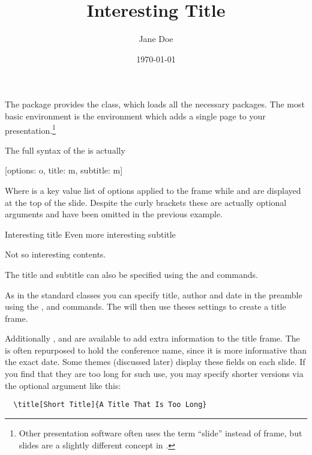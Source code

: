 The  package provides the  class, which loads all the
necessary packages. The most basic environment is the  environment
which adds a single page to your presentation.\footnote{Other presentation
  software often uses the term \enquote{slide} instead of frame, but slides are
  a slightly different concept in .}
The full syntax of the  is actually
\begin{lscommand}
  [options: o, title: m, subtitle: m]
\end{lscommand}
Where  is a key value list of options applied to the frame while
 and  are displayed at the top of the slide. Despite
the curly brackets these are actually optional arguments and have been
omitted in the previous example.
\begin{example}
\begin{frame}{%
  Interesting title}{%
  Even more interesting
  subtitle}
  
  Not so interesting contents.
\end{frame}
\end{example}
The title and subtitle can also be specified using the  and
 commands.

As in the standard classes you can specify title, author and date in the preamble
using the ,  and  commands. The
 will then use theses settings to create a title frame.
\begin{example}
\author{Jane Doe}
\title{Interesting Title}
\date{\today}

\maketitle
\end{example}
Additionally ,  and  are
available to add extra information to the title frame. The  is often
repurposed to hold the conference name, since it is more informative than the
exact date. Some themes (discussed later) display these fields on each slide.
If you find that they are too long for such use, you may specify shorter
versions via the optional argument like this:
\begin{verbatim}
  \title[Short Title]{A Title That Is Too Long}
\end{verbatim}

